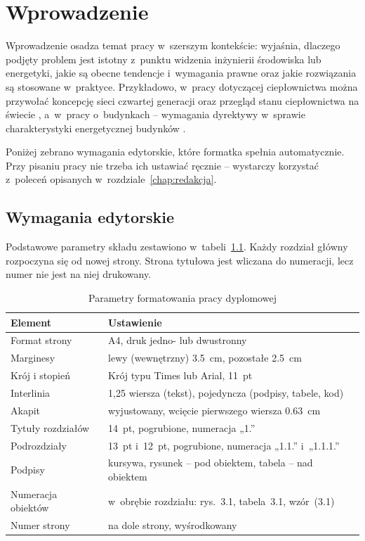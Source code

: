 \chapter{Wprowadzenie}
\label{chap:wprowadzenie}

Wprowadzenie osadza temat pracy w~szerszym kontekście: wyjaśnia, dlaczego
podjęty problem jest istotny z~punktu widzenia inżynierii środowiska lub
energetyki, jakie są obecne tendencje i~wymagania prawne oraz jakie
rozwiązania są stosowane w~praktyce. Przykładowo, w~pracy dotyczącej
ciepłownictwa można przywołać koncepcję sieci czwartej generacji
\cite{lund2014} oraz przegląd stanu ciepłownictwa na świecie
\cite{werner2017}, a~w~pracy o~budynkach -- wymagania dyrektywy
w~sprawie charakterystyki energetycznej budynków \cite{epbd2024}.

Poniżej zebrano wymagania edytorskie, które formatka spełnia automatycznie.
Przy pisaniu pracy nie trzeba ich ustawiać ręcznie -- wystarczy korzystać
z~poleceń opisanych w~rozdziale~\ref{chap:redakcja}.

\section{Wymagania edytorskie}
\label{sec:wymagania}

Podstawowe parametry składu zestawiono w~tabeli~\ref{tab:parametry}.
Każdy rozdział główny rozpoczyna się od nowej strony. Strona tytułowa jest
wliczana do numeracji, lecz numer nie jest na niej drukowany.

\begin{table}[htbp]
  \centering
  \caption{Parametry formatowania pracy dyplomowej}
  \label{tab:parametry}
  \begin{tabularx}{\linewidth}{@{}>{\raggedright\arraybackslash}p{4.4cm}X@{}}
    \toprule
    \textbf{Element} & \textbf{Ustawienie} \\
    \midrule
    Format strony      & A4, druk jedno- lub dwustronny \\
    Marginesy          & lewy (wewnętrzny) \qty{3.5}{cm}, pozostałe \qty{2.5}{cm} \\
    Krój i stopień     & Krój typu Times lub Arial, \qty{11}{pt} \\
    Interlinia         & 1,25 wiersza (tekst), pojedyncza (podpisy, tabele, kod) \\
    Akapit             & wyjustowany, wcięcie pierwszego wiersza \qty{0.63}{cm} \\
    Tytuły rozdziałów  & \qty{14}{pt}, pogrubione, numeracja „1.” \\
    Podrozdziały       & \qty{13}{pt} i~\qty{12}{pt}, pogrubione, numeracja „1.1.” i~„1.1.1.” \\
    Podpisy            & kursywa, rysunek -- pod obiektem, tabela -- nad obiektem \\
    Numeracja obiektów & w~obrębie rozdziału: rys.~3.1, tabela~3.1, wzór~(3.1) \\
    Numer strony       & na dole strony, wyśrodkowany \\
    \bottomrule
  \end{tabularx}
\end{table}

